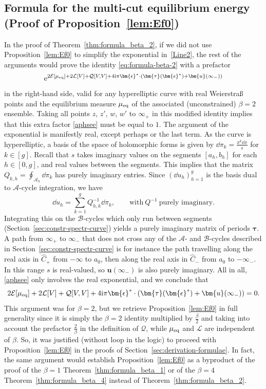 \documentclass[pdftex]{sigma}
\numberwithin{equation}{section}
\begin{document}
\subsection{Formula for the multi-cut equilibrium energy (Proof of Proposition~\ref{lem:Ef0})}
\label{sec:can}
In the proof of Theorem~\ref{thm:formula_beta_2}, if we did not use Proposition~\ref{lem:Ef0} to simplify the exponential in~\eqref{Line2}, the rest of the arguments would prove the identity \eqref{eq:formula-beta-2} with a prefactor
\begin{equation}
\label{aphsee}{\rm e}^{2\mathcal{E}[\mu_{{\rm eq}}] + 2\mathcal{L}[V] + \mathcal{Q}[V,V] + 4{\rm i}\pi \bm{\epsilon}^* \cdot (\bm{\tau}(\bm{\epsilon}^*) + \bm{u}(\infty_-))}
\end{equation}
in the right-hand side, valid for any hyperelliptic curve with real Weierstra\ss{} points and the equilibrium measure $\mu_{{\rm eq}}$ of the associated (unconstrained) $\beta = 2$ ensemble. Taking all points $z$, $z'$, $w$, $w'$ to $\infty_+$ in this modified identity implies that this extra factor \eqref{aphsee} must be equal to $1$. The argument of the exponential is manifestly real, except perhaps or the last term. As the curve is hyperelliptic, a basis of the space of holomorphic forms is given by $\dd \pi_k = \frac{x^{k} \dd x}{s}$ for $k \in [g]$. Recall that $s$ takes imaginary values on the segments $[a_h,b_h]$ for each $h \in [0,g]$, and real values between the segments. This implies that the matrix $Q_{k,h} = \oint_{\mathcal{A}_{h}} \dd \pi_k$ has purely imaginary entries. Since $(\dd u_h)_{h = 1}^{g}$ is the basis dual to $\mathcal{A}$-cycle integration, we have
\[
\dd u_h = \sum_{k = 1}^{g} Q^{-1}_{h,k} \dd \pi_k,\qquad \text{with}\ Q^{-1}\ \text{purely imaginary}.
\]
Integrating this on the $\mathcal{B}$-cycles which only run between segments (Section~\ref{sec:constr-spectr-curve}) yields a purely imaginary matrix of periods $\bm{\tau}$. A path from $\infty_+$ to $\infty_-$ that does not cross any of the $\mathcal{A}$- and $\mathcal{B}$-cycles described in Section~\ref{sec:constr-spectr-curve} is for instance the path travelling along the real axis in $\widehat{C}_+$ from $-\infty$ to $a_0$, then along the real axis in $\widehat{C}_-$ from $a_0$ to $-\infty_-$. In this range $s$ is real-valued, so $\bm{u}(\infty_-)$ is also purely imaginary. All in all, \eqref{aphsee} only involves the real exponential, and we conclude that
\[
2\mathcal{E}[\mu_{{\rm eq}}] + 2\mathcal{L}[V] + \mathcal{Q}[V,V] + 4{\rm i}\pi \bm{\epsilon}^* \cdot (\bm{\tau}(\bm{\epsilon}^*) + \bm{u}(\infty_-)) = 0.
\]
This argument was for $\beta = 2$, but we retrieve Proposition~\ref{lem:Ef0} in full generality since it is simply the $\beta = 2$ identity multiplied by $\frac{\beta}{2}$ and taking into account the prefactor $\frac{2}{\beta}$ in the definition of $\mathcal{Q}$, while $\mu_{{\rm eq}}$ and $\mathcal{L}$ are independent of $\beta$. So, it was justified (without loop in the logic) to proceed with Proposition~\ref{lem:Ef0} in the proofs of Section~\ref{sec:derivation-formulae}. In fact, the same argument would establish Proposition~\ref{lem:Ef0} as a byproduct of the proof of the $\beta = 1$ Theorem~\ref{thm:formula_beta_1} or of the $\beta = 4$ Theorem~\ref{thm:formula_beta_4} instead of Theorem~\ref{thm:formula_beta_2}.
\end{document}

